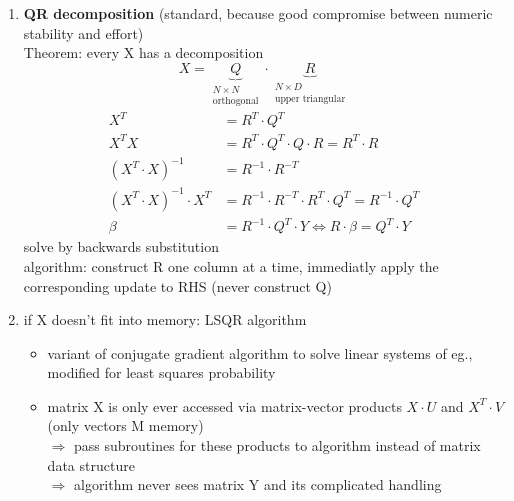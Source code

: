 \documentclass[11pt]{article}
\begin{document}
\begin{enumerate}
        \item \textbf{QR decomposition} (standard, because good compromise between
        numeric stability and effort) \\
        Theorem: every X has a decomposition
        \begin{equation*}
          X = \underbrace{Q}_{\substack{N \times N \\ \text{orthogonal}}} \cdot
          \underbrace{R}_{\substack{N \times D \\ \text{upper triangular}}}
        \end{equation*}
        \begin{equation*}
          \begin{align*}
            X^T &= R^T \cdot Q^T \\
            X^TX &= R^T\cdot Q^T\cdot Q \cdot R = R^T\cdot R \\
            (X^T \cdot X)^{-1} &= R^{-1}\cdot R^{-T} \\
            (X^T\cdot X)^{-1}\cdot X^T &= R^{-1} \cdot R^{-T} \cdot R^T \cdot Q^T =
            R^{-1} \cdot Q^T \\
            \beta &= R^{-1} \cdot Q^T\cdot Y \iff R\cdot \beta = Q^T \cdot Y
          \end{align*}
        \end{equation*}
        solve by backwards substitution \\
        algorithm: construct R one column at a time, immediatly apply the corresponding
        update to RHS (never construct Q)
        \item if X doesn't fit into memory: LSQR algorithm
        \begin{itemize}
          \item variant of conjugate gradient algorithm to solve linear systems of eg., modified for least squares
          probability
          \item matrix X is only ever accessed via matrix-vector products
          $X \cdot U$ and $X^T \cdot V$ (only vectors M memory) \\
          $\Rightarrow$ pass subroutines for these products to algorithm instead
          of matrix data structure \\
          $\Rightarrow$ algorithm never sees matrix Y and its complicated handling
        \end{itemize}
      \end{enumerate}
\end{document}
